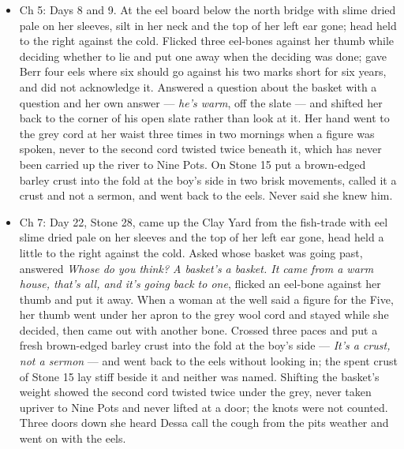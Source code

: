 \documentclass{design/chronicle}
\begin{document}
{\begin{itemize}[leftmargin=1.4em,itemsep=1pt,topsep=3pt,parsep=0pt]
\end{itemize}

\begin{itemize}[leftmargin=1.4em,itemsep=1pt,topsep=3pt,parsep=0pt]

\item Ch 5: Days 8 and 9. At the eel board below the north bridge with slime dried pale on her sleeves, silt in her neck and the top of her left ear gone; head held to the right against the cold. Flicked three eel-bones against her thumb while deciding whether to lie and put one away when the deciding was done; gave Berr four eels where six should go against his two marks short for six years, and did not acknowledge it. Answered a question about the basket with a question and her own answer --- \emph{he’s warm}, off the slate --- and shifted her back to the corner of his open slate rather than look at it. Her hand went to the grey cord at her waist three times in two mornings when a figure was spoken, never to the second cord twisted twice beneath it, which has never been carried up the river to Nine Pots. On Stone 15 put a brown-edged barley crust into the fold at the boy’s side in two brisk movements, called it a crust and not a sermon, and went back to the eels. Never said she knew him.

\end{itemize}

\begin{itemize}[leftmargin=1.4em,itemsep=1pt,topsep=3pt,parsep=0pt]

\item Ch 7: Day 22, Stone 28, came up the Clay Yard from the fish-trade with eel slime dried pale on her sleeves and the top of her left ear gone, head held a little to the right against the cold. Asked whose basket was going past, answered \emph{Whose do you think? A basket’s a basket. It came from a warm house, that’s all, and it’s going back to one}, flicked an eel-bone against her thumb and put it away. When a woman at the well said a figure for the Five, her thumb went under her apron to the grey wool cord and stayed while she decided, then came out with another bone. Crossed three paces and put a fresh brown-edged barley crust into the fold at the boy’s side --- \emph{It’s a crust, not a sermon} --- and went back to the eels without looking in; the spent crust of Stone 15 lay stiff beside it and neither was named. Shifting the basket’s weight showed the second cord twisted twice under the grey, never taken upriver to Nine Pots and never lifted at a door; the knots were not counted. Three doors down she heard Dessa call the cough from the pits weather and went on with the eels.


\end{itemize}}
\end{document}
